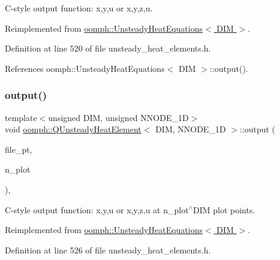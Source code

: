 C-\/style output function\+: x,y,u or x,y,z,u. 



Reimplemented from \hyperlink{classoomph_1_1UnsteadyHeatEquations_a1e8bd563df8386a5935be50dc5d3d640}{oomph\+::\+Unsteady\+Heat\+Equations$<$ D\+I\+M $>$}.



Definition at line 520 of file unsteady\+\_\+heat\+\_\+elements.\+h.



References oomph\+::\+Unsteady\+Heat\+Equations$<$ D\+I\+M $>$\+::output().

\mbox{\label{classoomph_1_1QUnsteadyHeatElement_af582182bc9c4df2fb77e4410b0579503}} 
\subsubsection{\texorpdfstring{output()}{output()}\hspace{0.1cm}{\footnotesize\ttfamily [4/4]}}
{\footnotesize\ttfamily template$<$unsigned D\+IM, unsigned N\+N\+O\+D\+E\+\_\+1D$>$ \\
void \hyperlink{classoomph_1_1QUnsteadyHeatElement}{oomph\+::\+Q\+Unsteady\+Heat\+Element}$<$ D\+IM, N\+N\+O\+D\+E\+\_\+1D $>$\+::output (\begin{DoxyParamCaption}\item[{F\+I\+LE $\ast$}]{file\+\_\+pt,  }\item[{const unsigned \&}]{n\+\_\+plot }\end{DoxyParamCaption})\hspace{0.3cm}{\ttfamily [inline]}, {\ttfamily [virtual]}}



C-\/style output function\+: x,y,u or x,y,z,u at n\+\_\+plot$^\wedge$\+D\+IM plot points. 



Reimplemented from \hyperlink{classoomph_1_1UnsteadyHeatEquations_aa63371c8600cb17a05b7bd00d89d1d2b}{oomph\+::\+Unsteady\+Heat\+Equations$<$ D\+I\+M $>$}.



Definition at line 526 of file unsteady\+\_\+heat\+\_\+elements.\+h.



